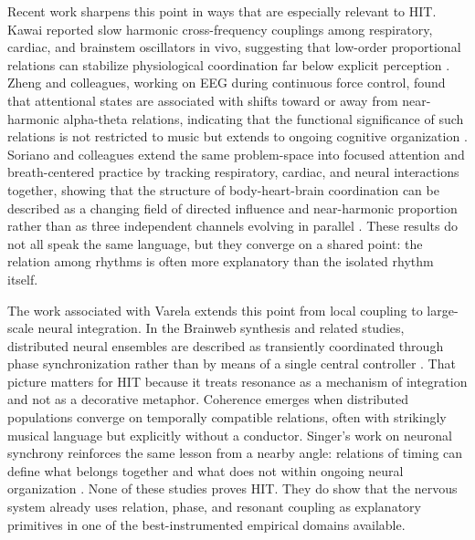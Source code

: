 Recent work sharpens this point in ways that are especially relevant to HIT. Kawai reported slow harmonic cross-frequency couplings among respiratory, cardiac, and brainstem oscillators in vivo, suggesting that low-order proportional relations can stabilize physiological coordination far below explicit perception \parencite{kawai_2023}. Zheng and colleagues, working on EEG during continuous force control, found that attentional states are associated with shifts toward or away from near-harmonic alpha-theta relations, indicating that the functional significance of such relations is not restricted to music but extends to ongoing cognitive organization \parencite{zheng_2025}. Soriano and colleagues extend the same problem-space into focused attention and breath-centered practice by tracking respiratory, cardiac, and neural interactions together, showing that the structure of body-heart-brain coordination can be described as a changing field of directed influence and near-harmonic proportion rather than as three independent channels evolving in parallel \parencite{soriano_2025}. These results do not all speak the same language, but they converge on a shared point: the relation among rhythms is often more explanatory than the isolated rhythm itself.

The work associated with Varela extends this point from local coupling to large-scale neural integration. In the Brainweb synthesis and related studies, distributed neural ensembles are described as transiently coordinated through phase synchronization rather than by means of a single central controller \parencite{varela_2001_brainweb, rodriguez_1999}. That picture matters for HIT because it treats resonance as a mechanism of integration and not as a decorative metaphor. Coherence emerges when distributed populations converge on temporally compatible relations, often with strikingly musical language but explicitly without a conductor. Singer's work on neuronal synchrony reinforces the same lesson from a nearby angle: relations of timing can define what belongs together and what does not within ongoing neural organization \parencite{singer_1999}. None of these studies proves HIT. They do show that the nervous system already uses relation, phase, and resonant coupling as explanatory primitives in one of the best-instrumented empirical domains available.

